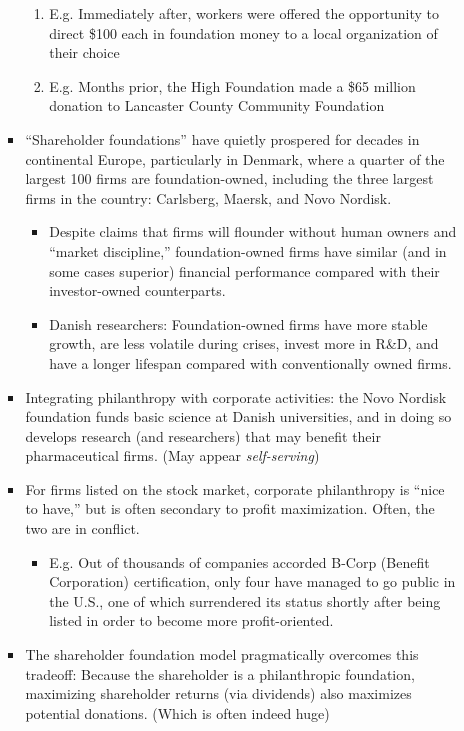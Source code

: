 \documentclass[oneside]{book}
\begin{document}
\begin{enumerate}
\begin{itemize}
\begin{itemize}
            \begin{enumerate}
                \item E.g. Immediately after, workers were offered the opportunity to direct \$100 each in foundation money to a local organization of their choice
                \item E.g. Months prior, the High Foundation made a \$65 million donation to Lancaster County Community Foundation
            \end{enumerate}
            \item ``Shareholder foundations'' have quietly prospered for decades in continental Europe, particularly in Denmark, where a quarter of the largest 100 firms are foundation-owned, including the three largest firms in the country: Carlsberg, Maersk, and Novo Nordisk.
            \begin{itemize}
                \item Despite claims that firms will flounder without human owners and “market discipline,” foundation-owned firms have similar (and in some cases superior) financial performance compared with their investor-owned counterparts. 
                \item Danish researchers: Foundation-owned firms have more stable growth, are less volatile during crises, invest more in R\&D, and have a longer lifespan compared with conventionally owned firms.  
            \end{itemize}
            \item Integrating philanthropy with corporate activities: the Novo Nordisk foundation funds basic science at Danish universities, and in doing so develops research (and researchers) that may benefit their pharmaceutical firms. (May appear \emph{self-serving})
            \item For firms listed on the stock market, corporate philanthropy is ``nice to have,'' but is often secondary to profit maximization. Often, the two are in conflict.
            \begin{itemize}
                \item E.g. Out of thousands of companies accorded B-Corp (Benefit Corporation) certification, only four have managed to go public in the U.S., one of which surrendered its status shortly after being listed in order to become more profit-oriented.
            \end{itemize}
            \item The shareholder foundation model pragmatically overcomes this tradeoff: Because the shareholder is a philanthropic foundation, maximizing shareholder returns (via dividends) also maximizes potential donations. (Which is often indeed huge)

\end{itemize}
\end{itemize}
\end{enumerate}
\end{document}

